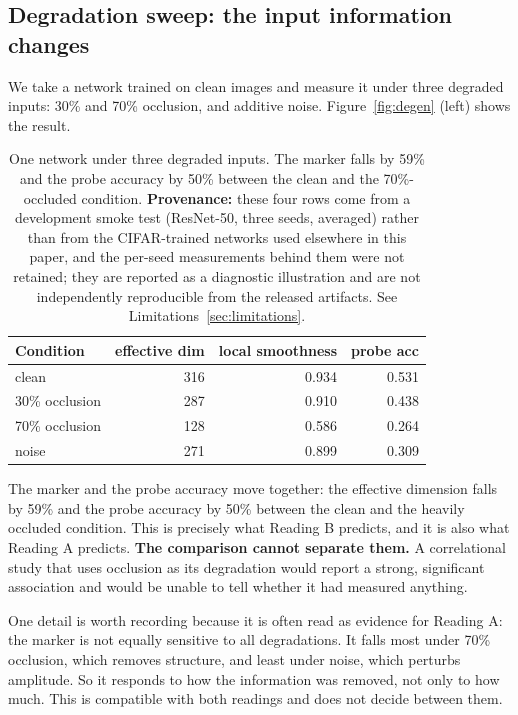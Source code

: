 \documentclass[10pt]{article}
\begin{document}
\subsection{Degradation sweep: the input information changes}

We take a network trained on clean images and measure it under three degraded
inputs: 30\% and 70\% occlusion, and additive noise. Figure~\ref{fig:degen}
(left) shows the result.

\begin{table}[t]
\centering
\small
\begin{tabular}{@{}lrrr@{}}
\hline
Condition & effective dim & local smoothness & probe acc \\
\hline
clean & 316 & 0.934 & 0.531 \\
30\% occlusion & 287 & 0.910 & 0.438 \\
70\% occlusion & 128 & 0.586 & 0.264 \\
noise & 271 & 0.899 & 0.309 \\
\hline
\end{tabular}
\caption{One network under three degraded inputs. The marker falls by 59\% and
the probe accuracy by 50\% between the clean and the 70\%-occluded condition.
\textbf{Provenance:} these four rows come from a development smoke test
(ResNet-50, three seeds, averaged) rather than from the CIFAR-trained networks
used elsewhere in this paper, and the per-seed measurements behind them were not
retained; they are reported as a diagnostic illustration and are not
independently reproducible from the released artifacts. See
Limitations~\ref{sec:limitations}.}
\label{tab:degen}
\end{table}

The marker and the probe accuracy move together: the effective dimension falls
by 59\% and the probe accuracy by 50\% between the clean and the heavily
occluded condition. This is precisely what Reading B predicts, and it is also
what Reading A predicts. \textbf{The comparison cannot separate them.} A
correlational study that uses occlusion as its degradation would report a
strong, significant association and would be unable to tell whether it had
measured anything.

One detail is worth recording because it is often read as evidence for Reading
A: the marker is not equally sensitive to all degradations. It falls most
under 70\% occlusion, which removes structure, and least under noise, which
perturbs amplitude. So it responds to how the information was removed, not only
to how much. This is compatible with both readings and does not decide between
them.
\end{document}
